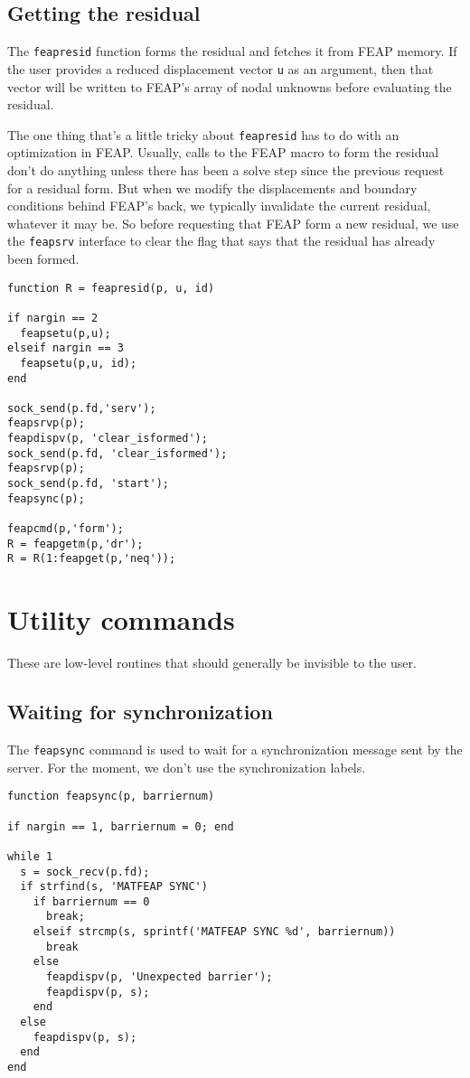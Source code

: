 \subsection{Getting the residual}

The {\tt feapresid} function forms the residual and fetches it
from FEAP memory.  If the user provides a reduced displacement
vector {\tt u} as an argument, then that vector will be written
to FEAP's array of nodal unknowns before evaluating the residual.

The one thing that's a little tricky about {\tt feapresid} has to do
with an optimization in FEAP.  Usually, calls to the FEAP macro to
form the residual don't do anything unless there has been a solve
step since the previous request for a residual form.  But when we
modify the displacements and boundary conditions behind FEAP's back,
we typically invalidate the current residual, whatever it may be.
So before requesting that FEAP form a new residual, we use the 
{\tt feapsrv} interface to clear the flag that says that the residual has
already been formed.

\begin{verbatim}
function R = feapresid(p, u, id)

if nargin == 2
  feapsetu(p,u);
elseif nargin == 3
  feapsetu(p,u, id);
end

sock_send(p.fd,'serv');
feapsrvp(p);
feapdispv(p, 'clear_isformed');
sock_send(p.fd, 'clear_isformed');
feapsrvp(p);
sock_send(p.fd, 'start');
feapsync(p);

feapcmd(p,'form');
R = feapgetm(p,'dr');
R = R(1:feapget(p,'neq'));
\end{verbatim}
\section {Utility commands}

These are low-level routines that should generally be invisible
to the user.

\subsection{Waiting for synchronization}

The {\tt feapsync} command is used to wait for a synchronization
message sent by the server.  For the moment, we don't use the
synchronization labels.

\begin{verbatim}
function feapsync(p, barriernum)

if nargin == 1, barriernum = 0; end

while 1
  s = sock_recv(p.fd);
  if strfind(s, 'MATFEAP SYNC')
    if barriernum == 0
      break;
    elseif strcmp(s, sprintf('MATFEAP SYNC %d', barriernum))
      break
    else
      feapdispv(p, 'Unexpected barrier');
      feapdispv(p, s);
    end
  else
    feapdispv(p, s);
  end
end
\end{verbatim}
